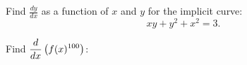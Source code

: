 \begin{questions}
\begin{multicols}{2}
\end{multicols}

\newpage

\question Find $\displaystyle \frac{dy}{dx}$ as a function of $x$ and $y$ for the implicit curve:
\[xy+y^2+x^2=3.\]
\begin{solutionorbox}[2.5in]

\end{solutionorbox}

\question Find $\displaystyle \displaystyle \frac{d}{dx}\left(f(x)^{100}\right)$:
\begin{solutionorbox}[2.5in]

\end{solutionorbox}


\end{questions}

